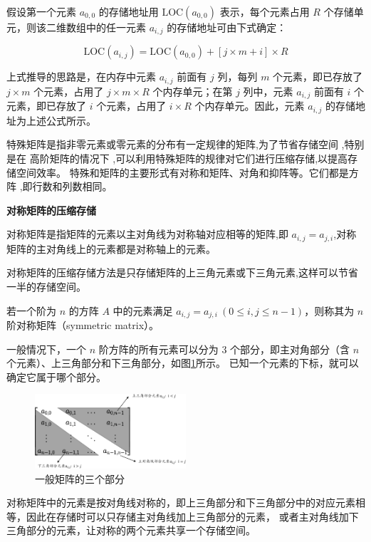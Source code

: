 \documentclass[lang=cn,newtx,10pt,scheme=chinese]{../elegantbook}
\begin{document}
假设第一个元素 $a_{0,0}$ 的存储地址用 $\text{LOC}(a_{0,0})$ 表示，每个元素占用 $R$ 个存储单元，则该二维数组中的任一元素 $a_{i,j}$ 的存储地址可由下式确定：

\begin{equation}
\text{LOC}(a_{i,j}) = \text{LOC}(a_{0,0}) + [j \times m + i] \times R
\end{equation}

上式推导的思路是，在内存中元素 $a_{i,j}$ 前面有 $j$ 列，每列 $m$ 个元素，即已存放了 $j \times m$ 个元素，占用了 $j \times m \times R$ 个内存单元；在第 $j$ 列中，元素 $a_{i,j}$ 前面有 $i$ 个元素，即已存放了 $i$ 个元素，占用了 $i \times R$ 个内存单元。因此，元素 $a_{i,j}$ 的存储地址为上述公式所示。

特殊矩阵是指非零元素或零元素的分布有一定规律的矩阵,为了节省存储空间 ,特别是在
高阶矩阵的情况下 ,可以利用特殊矩阵的规律对它们进行压缩存储,以提高存储空间效率。
特殊和矩阵的主要形式有对称和矩阵、对角和抑阵等。它们都是方阵 ,即行数和列数相同。

\textbf{对称矩阵的压缩存储}

对称矩阵是指矩阵的元素以主对角线为对称轴对应相等的矩阵,即 $a_{i,j} = a_{j,i}$,对称矩阵的主对角线上的元素都是对称轴上的元素。

对称矩阵的压缩存储方法是只存储矩阵的上三角元素或下三角元素,这样可以节省一半的存储空间。


若一个阶为 $n$ 的方阵 $A$ 中的元素满足 $a_{i,j} = a_{j,i} \ (0 \leq i, j \leq n-1)$，则称其为 $n$ 阶对称矩阵（symmetric matrix）。

一般情况下，一个 $n$ 阶方阵的所有元素可以分为 3 个部分，即主对角部分（含 $n$ 个元素）、上三角部分和下三角部分，如图\ref{fig:common_matrix}所示。
已知一个元素的下标，就可以确定它属于哪个部分。

\begin{figure}[h]
  \centering
  \includegraphics[width=0.5\textwidth]{./figure/pdf/cropped/commonMatrix.pdf}
  \caption{一般矩阵的三个部分}
  \label{fig:common_matrix}
\end{figure}

对称矩阵中的元素是按对角线对称的，即上三角部分和下三角部分中的对应元素相等，因此在存储时可以只存储主对角线加上三角部分的元素，
或者主对角线加下三角部分的元素，让对称的两个元素共享一个存储空间。
\end{document}
